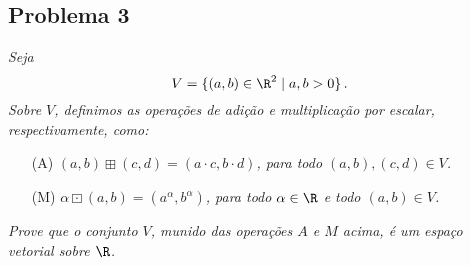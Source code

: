 \subsection*{Problema 3}
\textit{Seja
\[
V = \{ ( a , b ) \in \R^2 \mid a , b > 0 \} \, .
\]
Sobre  $V$,  definimos as  operações  de  adição  e multiplicação  por
escalar, respectivamente, como:}
\begin{itemize}
\item[(A)] \textit{ $( a , b ) \boxplus ( c , d ) = ( a \cdot c , b \cdot d )$, para todo $(a,b), (c,d)
\in V$.}

\item[(M)] \textit{ 
$\alpha \boxdot ( a , b ) = ( a^{\alpha} , b^{\alpha} )$, para todo
$\alpha \in \R$ e todo $( a , b ) \in V$.}
\end{itemize}

\textit{ Prove que o  conjunto $V$, munido das operações $A$ e  $M$ acima, é um
espaço vetorial sobre $\R$. }

